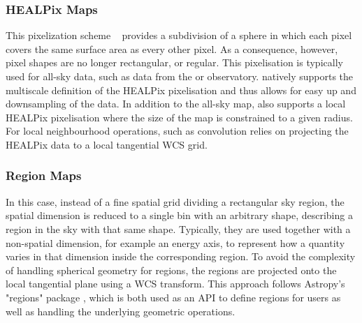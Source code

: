 \documentclass[traditabstract, longauth]{aa}
\begin{document}
{\subsubsection{HEALPix Maps}
This pixelization scheme ~\citep{Calabretta2002} provides a
subdivision of a sphere in which each pixel covers the same surface area as
every other pixel. As a consequence, however, pixel shapes are no longer
rectangular, or regular.
This pixelisation is typically used for all-sky data, such as data
from the \hawc or \fermi observatory. \gammapy natively supports
the multiscale definition of the HEALPix pixelisation and thus
allows for easy up and downsampling of the data. In addition to
the all-sky map, \gammapy also supports a local HEALPix
pixelisation where the size of the map is constrained to a given
radius.
For local neighbourhood operations, such as convolution \gammapy relies
on projecting the HEALPix data to a local tangential WCS grid.

\subsubsection{Region Maps}
In this case, instead of a fine spatial grid
dividing a rectangular sky region, the spatial dimension is reduced to a single
bin with an arbitrary shape, describing a region in the sky with that same
shape. Typically, they are used together with a non-spatial dimension, for
example an energy axis, to represent how a quantity varies in that dimension
inside the corresponding region. To avoid the complexity of handling
spherical geometry for regions, the regions are projected onto the local
tangential plane using a WCS transform. This approach follows Astropy's "regions"
package \citep{AstropyRegions2022}, which is both used as an API to define regions
for users as well as handling the underlying geometric operations.


}
\end{document}
